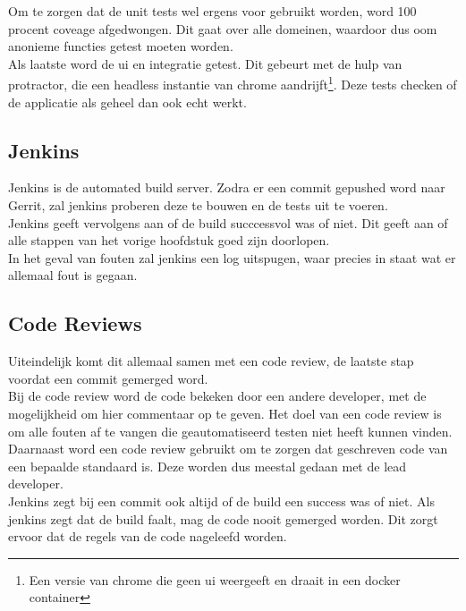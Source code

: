 Om te zorgen dat de unit tests wel ergens voor gebruikt worden, word 100 procent coveage afgedwongen. Dit gaat over alle domeinen, waardoor dus oom anonieme functies getest moeten worden. \\

Als laatste word de ui en integratie getest. Dit gebeurt met de hulp van protractor, die een headless instantie van chrome aandrijft\footnote{Een versie van chrome die geen ui weergeeft en draait in een docker container}. Deze tests checken of de applicatie als geheel dan ook echt werkt.

\subsection{Jenkins}

Jenkins is de automated build server. Zodra er een commit gepushed word naar Gerrit, zal jenkins proberen deze te bouwen en de tests uit te voeren. \\

Jenkins geeft vervolgens aan of de build succcessvol was of niet. Dit geeft aan of alle stappen van het vorige hoofdstuk goed zijn doorlopen. \\

In het geval van fouten zal jenkins een log uitspugen, waar precies in staat wat er allemaal fout is gegaan.

\subsection{Code Reviews}

Uiteindelijk komt dit allemaal samen met een code review, de laatste stap voordat een commit gemerged word. \\

Bij de code review word de code bekeken door een andere developer, met de mogelijkheid om hier commentaar op te geven. Het doel van een code review is om alle fouten af te vangen die geautomatiseerd testen niet heeft kunnen vinden. \\

Daarnaast word een code review gebruikt om te zorgen dat geschreven code van een bepaalde standaard is. Deze worden dus meestal gedaan met de lead developer. \\

Jenkins zegt bij een commit ook altijd of de build een success was of niet. Als jenkins zegt dat de build faalt, mag de code nooit gemerged worden. Dit zorgt ervoor dat de regels van de code nageleefd worden. \\

